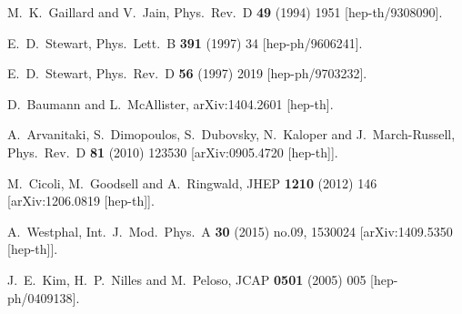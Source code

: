 \begin{thebibliography}{10}
  M.~K.~Gaillard and V.~Jain,
  Phys.\ Rev.\ D {\bf 49} (1994) 1951
  [hep-th/9308090].


  E.~D.~Stewart,
  Phys.\ Lett.\ B {\bf 391} (1997) 34
  [hep-ph/9606241].


  E.~D.~Stewart,
  Phys.\ Rev.\ D {\bf 56} (1997) 2019
  [hep-ph/9703232].


  D.~Baumann and L.~McAllister,
  arXiv:1404.2601 [hep-th].


  A.~Arvanitaki, S.~Dimopoulos, S.~Dubovsky, N.~Kaloper and J.~March-Russell,
  Phys.\ Rev.\ D {\bf 81} (2010) 123530
  [arXiv:0905.4720 [hep-th]].


  M.~Cicoli, M.~Goodsell and A.~Ringwald,
  JHEP {\bf 1210} (2012) 146
  [arXiv:1206.0819 [hep-th]].


  A.~Westphal,
  Int.\ J.\ Mod.\ Phys.\ A {\bf 30} (2015) no.09,  1530024
  [arXiv:1409.5350 [hep-th]].


  J.~E.~Kim, H.~P.~Nilles and M.~Peloso,
  JCAP {\bf 0501} (2005) 005
  [hep-ph/0409138].



\end{thebibliography}
